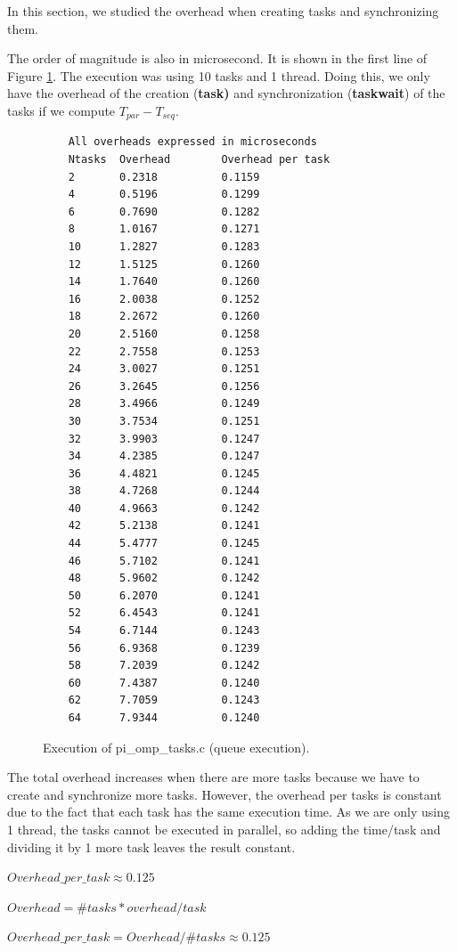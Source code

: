 \documentclass[12pt, a4paper]{article}
\begin{document}
In this section, we studied the overhead when creating tasks and synchronizing them.

The order of magnitude is also in microsecond. It is shown in the first line of Figure \ref{piomptasks}. The execution was using 10 tasks and 1 thread. Doing this, we only have the overhead of the creation (\textbf{task)} and synchronization (\textbf{taskwait}) of the tasks if we compute $T_{par} - T_{seq}$.

\begin{figure}[H]
\begin{lstlisting}
	All overheads expressed in microseconds
	Ntasks  Overhead        Overhead per task
	2       0.2318          0.1159
	4       0.5196          0.1299
	6       0.7690          0.1282
	8       1.0167          0.1271
	10      1.2827          0.1283
	12      1.5125          0.1260
	14      1.7640          0.1260
	16      2.0038          0.1252
	18      2.2672          0.1260
	20      2.5160          0.1258
	22      2.7558          0.1253
	24      3.0027          0.1251
	26      3.2645          0.1256
	28      3.4966          0.1249
	30      3.7534          0.1251
	32      3.9903          0.1247
	34      4.2385          0.1247
	36      4.4821          0.1245
	38      4.7268          0.1244
	40      4.9663          0.1242
	42      5.2138          0.1241
	44      5.4777          0.1245
	46      5.7102          0.1241
	48      5.9602          0.1242
	50      6.2070          0.1241
	52      6.4543          0.1241
	54      6.7144          0.1243
	56      6.9368          0.1239
	58      7.2039          0.1242
	60      7.4387          0.1240
	62      7.7059          0.1243
	64      7.9344          0.1240
	\end{lstlisting}
	\caption{Execution of pi\_omp\_tasks.c (queue execution).}
	\label{piomptasks}
\end{figure}

The total overhead increases when there are more tasks because we have to create and synchronize more tasks. However, the overhead per tasks is constant due to the fact that each task has the same execution time. As we are only using 1 thread, the tasks cannot be executed in parallel, so adding the time/task and dividing it by 1 more task leaves the result constant.

$ Overhead\_per\_task \approx 0.125 $

$ Overhead = \#tasks * overhead/task $

$ Overhead\_per\_task = Overhead/\#tasks \approx 0.125 $
\end{document}
